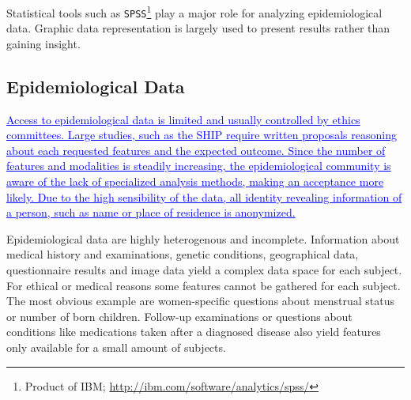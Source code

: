 \documentclass[journal]{style/vgtc} 			          %
\newcommand{\add}[1]{\textcolor{blue}{\uline{#1}}}
\newcommand{\com}[1]{\textcolor{orange}{\uline{#1}}}
\begin{document}
Statistical tools such as \texttt{SPSS}\footnote{Product of IBM; \url{http://ibm.com/software/analytics/spss/}} play a major role for analyzing epidemiological data.
%
Graphic data representation is largely used to present results rather than gaining insight.
	
\subsection{Epidemiological Data} \label{EpidemiologicalData}
%
\add{Access to epidemiological data is limited and usually controlled by ethics committees.
%
Large studies, such as the SHIP require written proposals reasoning about each requested features and the expected outcome.
%
Since the number of features and modalities is steadily increasing, the epidemiological community is aware of the lack of specialized analysis methods, making an acceptance more likely.
%
Due to the high sensibility of the data, all identity revealing information of a person, such as name or place of residence is anonymized.
}

Epidemiological data are highly heterogenous and incomplete.
%
Information about medical history and examinations, genetic conditions, geographical data, questionnaire results and image data yield a complex data space for each subject.
%
For ethical or medical reasons some features cannot be gathered for each subject.
%
The most obvious example are women-specific questions about menstrual status or number of born children.
%
Follow-up examinations or questions about conditions like medications taken after a diagnosed disease also yield features only available for a small amount of subjects.
%
\end{document}
